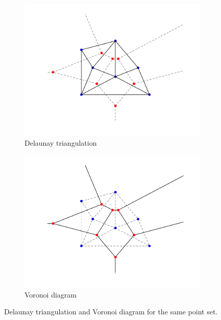 \begin{figure}[ht]
    \centering
    \begin{subfigure}[b]{0.4\textwidth}
        \centering
        \includegraphics[width=\textwidth]{report/Images/Theory/voronoi/voronoi_duality_delaunay.png}
        \caption{Delaunay triangulation}
        \label{fig:ex:voronoi-delaunay}
    \end{subfigure}
    \begin{subfigure}[b]{0.4\textwidth}
        \centering
        \includegraphics[width=\textwidth]{report/Images/Theory/voronoi/voronoi_duality_voronoi.png}
        \caption{Voronoi diagram}
        \label{fig:ex:voronoi-voronoi}
    \end{subfigure}
    \caption[Duality of Delaunay triangulations and Voronoi diagrams]{Delaunay triangulation and Voronoi diagram for the same point set.}
    \label{fig:ex:voronoi}
\end{figure}

